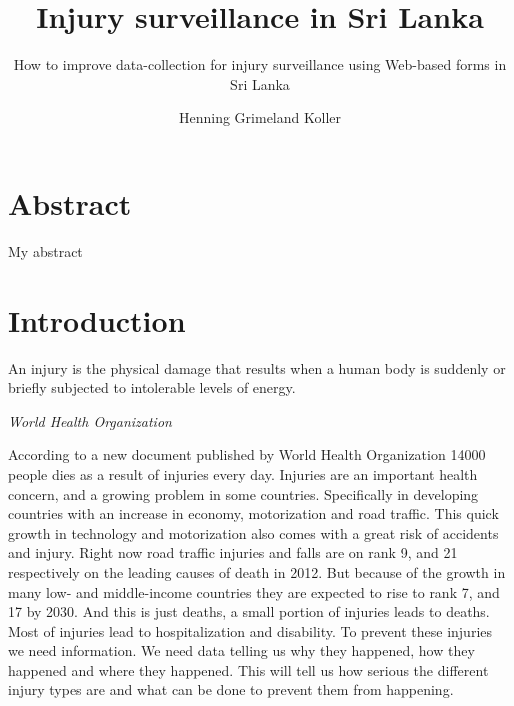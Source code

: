 \documentclass[UKenglish]{ifimaster}
\title{Injury surveillance in Sri Lanka}
\subtitle{How to improve data-collection for injury surveillance
using Web-based forms in Sri Lanka}
\author{Henning Grimeland Koller}
\newcommand{\WHO}{World Health Organization }
\begin{document}
\ififorside{}
\frontmatter{}
\maketitle{}

\chapter*{Abstract}
My abstract
\tableofcontents{}
\mainmatter{}

\chapter{Introduction}
\epigraph{
An injury is the physical damage that results when a human body is suddenly or briefly subjected to intolerable levels of energy.}{\textit{\WHO\cite{who-guide}}}

According to a new document published by \WHO\cite{who-article} 14000 people dies as a result of injuries every day.
Injuries are an important health concern, and a growing problem in some countries. Specifically in developing countries with an increase in economy, motorization and road traffic.
This quick growth in technology and motorization also comes with a great risk of accidents and injury.
Right now road traffic injuries and falls are on rank 9, and 21 respectively on the leading causes of death in 2012.\cite[4]{who-article} 
But because of the growth in many low- and middle-income countries they are expected to rise to rank 7, and 17 by 2030.
And this is just deaths, a small portion of injuries leads to deaths. Most of injuries lead to hospitalization and disability.
To prevent these injuries we need information. We need data telling us why they happened, how they happened and where they happened. 
This will tell us how serious the different injury types are and what can be done to prevent them from happening.
\end{document}
